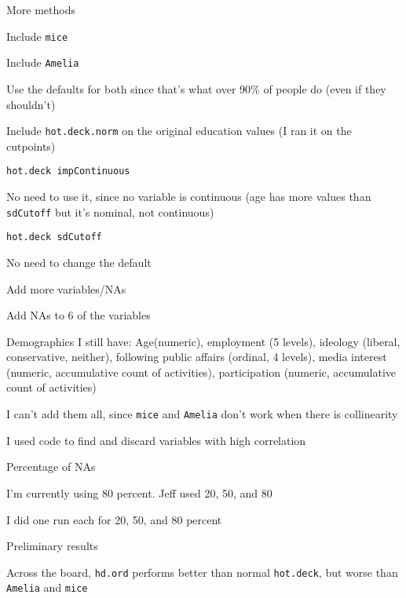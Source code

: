 \documentclass[12pt]{article}
\begin{document}
\begin{coi}
		\item More methods
			\begin{coi}
				\item Include \texttt{mice}
				\item Include \texttt{Amelia}
				\item Use the defaults for both since that's what over 90\% of people do (even if they shouldn't)
				\item Include \texttt{hot.deck.norm} on the original education values (I ran it on the cutpoints)
			\end{coi}
		\item \texttt{hot.deck impContinuous}
			\begin{coi}
				\item No need to use it, since no variable is continuous (age has more values than \texttt{sdCutoff} but it's nominal, not continuous)
			\end{coi}
		\item \texttt{hot.deck sdCutoff}
			\begin{coi}
				\item No need to change the default
			\end{coi}
		\item Add more variables/NAs
			\begin{coi}
				\item Add NAs to 6 of the variables
				\item Demographics I still have: Age(numeric), employment (5 levels), ideology (liberal, conservative, neither), following public affairs (ordinal, 4 levels), media interest (numeric, accumulative count of activities), participation (numeric, accumulative count of activities)
				\item I can't add them all, since \texttt{mice} and \texttt{Amelia} don't work when there is collinearity
				\item I used code to find and discard variables with high correlation
			\end{coi}
		\item Percentage of NAs
			\begin{coi}
				\item I'm currently using 80 percent. Jeff used 20, 50, and 80
				\item I did one run each for 20, 50, and 80 percent
			\end{coi}
		\item Preliminary results
			\begin{coi}
				\item Across the board, \texttt{hd.ord} performs better than normal \texttt{hot.deck}, but worse than \texttt{Amelia} and \texttt{mice}

\end{coi}
\end{coi}
\end{document}
